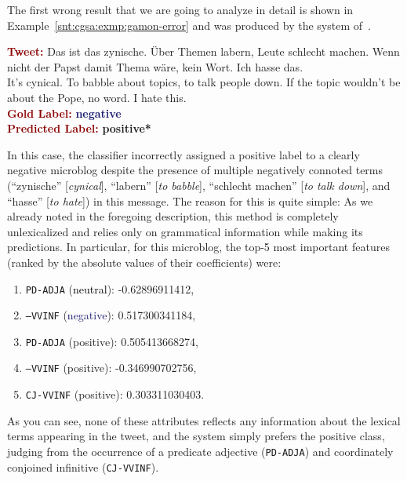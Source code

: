 The first wrong result that we are going to analyze in detail is shown
in Example~\ref{snt:cgsa:exmp:gamon-error} and was produced by the
system of~\citet{Gamon:04}.
\begin{example}\label{snt:cgsa:exmp:mohammad-error}
  \noindent\textup{\bfseries\textcolor{darkred}{Tweet:}} {\upshape Das ist das zynische. \"Uber Themen labern, Leute schlecht machen. Wenn nicht der Papst damit Thema w\"are, kein Wort. Ich hasse das.}\\
  \noindent It's cynical.  To babble about topics, to talk people
  down.  If the topic wouldn't be about the Pope, no word. I
  hate this.\\[\exampleSep]
  \noindent\textup{\bfseries\textcolor{darkred}{Gold Label:}}\hspace*{4.3em}\textbf{%
    \upshape\textcolor{midnightblue}{negative}}\\
 \noindent\textup{\bfseries\textcolor{darkred}{Predicted Label:}}\hspace*{2em}\textbf{%
    \upshape\textcolor{green3}{positive*}}\label{snt:cgsa:exmp:gamon-error}
\end{example}
\noindent{} In this case, the classifier incorrectly assigned a
positive label to a clearly negative microblog despite the presence
of multiple negatively connoted terms (``zynische''
[\emph{cynical}], ``labern'' [\emph{to babble}], ``schlecht machen''
[\emph{to talk down}], and ``hasse'' [\emph{to hate}]) in this
message.  The reason for this is quite simple: As we already noted
in the foregoing description, this method is completely
unlexicalized and relies only on grammatical information while
making its predictions.  In particular, for this microblog, the
top-5 most important features (ranked by the absolute values of
their coefficients) were:
\begin{enumerate}
\item \texttt{PD-ADJA} (\textcolor{black}{neutral}): -0.62896911412,
\item \texttt{---VVINF} (\textcolor{midnightblue}{negative}): 0.517300341184,
\item \texttt{PD-ADJA} (\textcolor{green3}{positive}): 0.505413668274,
\item \texttt{---VVINF} (\textcolor{green3}{positive}): -0.346990702756,
\item \texttt{CJ-VVINF} (\textcolor{green3}{positive}):
  0.303311030403.
\end{enumerate}
As you can see, none of these attributes reflects any information
about the lexical terms appearing in the tweet, and the system simply
prefers the positive class, judging from the occurrence of a predicate
adjective (\texttt{PD-ADJA}) and coordinately conjoined infinitive
(\texttt{CJ-VVINF}).

